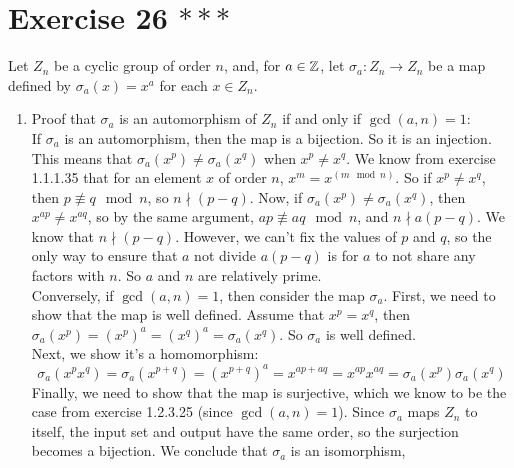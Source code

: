 \documentclass[12pt]{article}
\begin{document}
    \section*{Exercise 26 $***$}
    Let $Z_n$ be a cyclic group of order $n$, and, for $a \in \mathbb{Z}$,
    let $\sigma_a: Z_n \to Z_n$ be a map
    defined by $\sigma_a(x) = x^a$ for each $x \in Z_n$. \\
    \begin{enumerate}[label=\textbf{\alph*.}]
        \item 
            Proof that $\sigma_a$ is an automorphism of $Z_n$
            if and only if $\gcd(a, n) = 1$: \\
            If $\sigma_a$ is an automorphism,
            then the map is a bijection.
            So it is an injection.
            This means that $\sigma_a(x^p) \neq \sigma_a(x^q)$
            when $x^p \neq x^q$.
            We know from exercise 1.1.1.35 that for an element $x$ of
            order $n$, $x^m = x^{(m \mod n)}$.
            So if $x^p \neq x^q$, then $p \not\equiv q \mod n$,
            so $n \nmid (p - q)$.
            Now, if $\sigma_a(x^p) \neq \sigma_a(x^q)$,
            then $x^{ap} \neq x^{aq}$,
            so by the same argument, $ap \not\equiv aq \mod n$,
            and $n \nmid a(p - q)$.
            We know that $n \nmid (p-q)$.
            However, we can't fix the values of $p$ and $q$,
            so the only way to ensure that $a$ not divide $a(p - q)$
            is for $a$ to not share any factors with $n$.
            So $a$ and $n$ are relatively prime. \\
            Conversely, if $\gcd(a, n) = 1$,
            then consider the map $\sigma_a$.
            First, we need to show that the map is well defined.
            Assume that $x^p = x^q$,
            then $\sigma_a(x^p) = (x^p)^a = (x^q)^a = \sigma_a(x^q)$.
            So $\sigma_a$ is well defined. \\
            Next, we show it's a homomorphism:
            \[ \sigma_a(x^px^q) = \sigma_a(x^{p + q})
            = (x^{p + q})^a
            = x^{ap + aq}
            = x^{ap}x^{aq}
            = \sigma_a(x^p)\sigma_a(x^q) \]
            Finally, we need to show that the map is surjective,
            which we know to be the case from
            exercise 1.2.3.25 (since $\gcd(a, n) = 1$).
            Since $\sigma_a$ maps $Z_n$ to itself,
            the input set and output have the same order,
            so the surjection becomes a bijection.
            We conclude that $\sigma_a$ is an isomorphism,

\end{enumerate}
\end{document}
